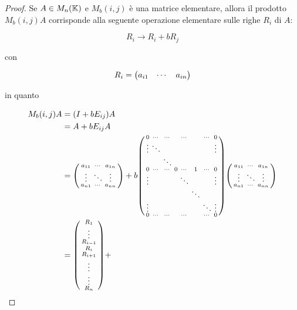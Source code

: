 \begin{proof}
	Se $ A \in M_{n}(\mathbb{K}) $ e $ M_{b}(i,j) $ è una matrice elementare, allora il prodotto $ M_{b}(i,j) A $ corrisponde alla seguente operazione elementare sulle righe $ R_{i} $ di $ A $:
	
	\begin{equation}
		R_{i} \to R_{i} + b R_{j}
	\end{equation}

	con
	
	\begin{equation}
		R_{i} = \mqty(\dmat{ a_{i1} & \cdots & a_{in} })
	\end{equation}

	in quanto
	
	\begin{align}
		\begin{split}
			M_{b}(i,j) A &= (I + b E_{ij}) A\\
			&= A + b E_{ij} A\\
			&= \smqty(\dmat{ a_{11} & \cdots & a_{1n} \\ %
							\vdots & \ddots & \vdots \\ %
							a_{n1} & \cdots & a_{nn} }) + %
				b \smqty(\dmat{ 0 & \cdots & \cdots & & \cdots & & \cdots & 0 \\ %
								\vdots & \ddots & & & & & & \vdots \\ %
								& & \ddots & & & & & \\ %
								0 & \cdots & \cdots & 0 & \cdots & 1 & \cdots & 0 \\ %
								\vdots & & & & \ddots & & & \vdots \\ %
								& & & & & \ddots & & \\ %
								\vdots & & & & & & \ddots & \vdots \\ %
								0 & \cdots & \cdots & & \cdots & & \cdots & 0 }) %
				\smqty(\dmat{ a_{11} & \cdots & a_{1n} \\ %
							\vdots & \ddots & \vdots \\ %
							a_{n1} & \cdots & a_{nn} })\\
			&= \smqty(\dmat{ R_{1} \\ %
							\vdots \\ %
							R_{i-1} \\ %
							R_{i} \\ %
							R_{i+1} \\ %
							\vdots \\ %
							\vdots \\ %
							R_{n} }) + %

\end{split}
\end{align}
\end{proof}
